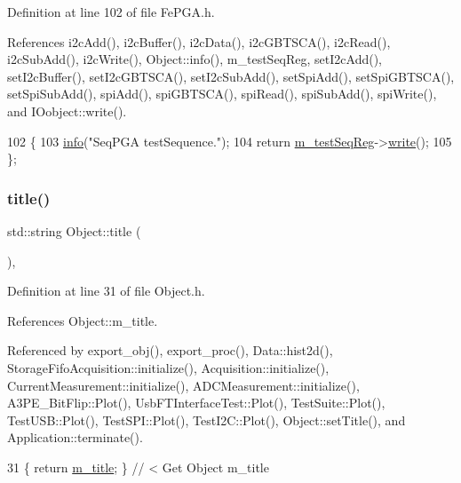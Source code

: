 Definition at line 102 of file Fe\+P\+G\+A.\+h.



References i2c\+Add(), i2c\+Buffer(), i2c\+Data(), i2c\+G\+B\+T\+S\+C\+A(), i2c\+Read(), i2c\+Sub\+Add(), i2c\+Write(), Object\+::info(), m\+\_\+test\+Seq\+Reg, set\+I2c\+Add(), set\+I2c\+Buffer(), set\+I2c\+G\+B\+T\+S\+C\+A(), set\+I2c\+Sub\+Add(), set\+Spi\+Add(), set\+Spi\+G\+B\+T\+S\+C\+A(), set\+Spi\+Sub\+Add(), spi\+Add(), spi\+G\+B\+T\+S\+C\+A(), spi\+Read(), spi\+Sub\+Add(), spi\+Write(), and I\+Oobject\+::write().


\begin{DoxyCode}
102                             \{
103     \hyperlink{classObject_a644fd329ea4cb85f54fa6846484b84a8}{info}(\textcolor{stringliteral}{"SeqPGA testSequence."});
104     \textcolor{keywordflow}{return} \hyperlink{classFePGA_a67bc3c8f923b673100974fd86096393e}{m\_testSeqReg}->\hyperlink{classIOobject_a9f6984bc9f0fadcf800f1be2523ac744}{write}();
105   \};
\end{DoxyCode}
\mbox{\label{classObject_a73a0f1a41828fdd8303dd662446fb6c3}} 
\subsubsection{\texorpdfstring{title()}{title()}}
{\footnotesize\ttfamily std\+::string Object\+::title (\begin{DoxyParamCaption}{ }\end{DoxyParamCaption})\hspace{0.3cm}{\ttfamily [inline]}, {\ttfamily [inherited]}}



Definition at line 31 of file Object.\+h.



References Object\+::m\+\_\+title.



Referenced by export\+\_\+obj(), export\+\_\+proc(), Data\+::hist2d(), Storage\+Fifo\+Acquisition\+::initialize(), Acquisition\+::initialize(), Current\+Measurement\+::initialize(), A\+D\+C\+Measurement\+::initialize(), A3\+P\+E\+\_\+\+Bit\+Flip\+::\+Plot(), Usb\+F\+T\+Interface\+Test\+::\+Plot(), Test\+Suite\+::\+Plot(), Test\+U\+S\+B\+::\+Plot(), Test\+S\+P\+I\+::\+Plot(), Test\+I2\+C\+::\+Plot(), Object\+::set\+Title(), and Application\+::terminate().


\begin{DoxyCode}
31 \{ \textcolor{keywordflow}{return} \hyperlink{classObject_affbeea1953eb5163573b92fad8f75727}{m\_title};      \} \textcolor{comment}{// < Get Object m\_title}
\end{DoxyCode}
\mbox{\label{classFePGA_ac7698a9f59f7290a6bb648030976597f}} 
